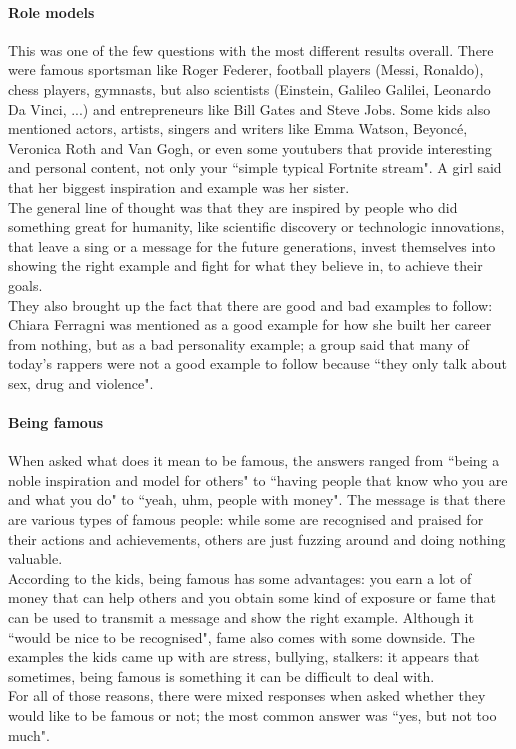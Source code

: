 \documentclass[12pt]{scrartcl}
\begin{document}
		\paragraph{Role models} This was one of the few questions with the most different results overall. There were famous sportsman like Roger Federer, football players (Messi, Ronaldo), chess players, gymnasts, but also scientists (Einstein, Galileo Galilei, Leonardo Da Vinci, ...) and entrepreneurs like Bill Gates and Steve Jobs. Some kids also mentioned actors, artists, singers and writers like Emma Watson, Beyoncé, Veronica Roth and Van Gogh, or even some youtubers that provide interesting and personal content, not only your ``simple typical Fortnite stream". A girl said that her biggest inspiration and example was her sister.\\
		The general line of thought was that they are inspired by people who did something great for humanity, like scientific discovery or technologic innovations, that leave a sing or a message for the future generations, invest themselves into showing the right example and fight for what they believe in, to achieve their goals.\\
		They also brought up the fact that there are good and bad examples to follow: Chiara Ferragni was mentioned as a good example for how she built her career from nothing, but as a bad personality example; a group said that many of today's rappers were not a good example to follow because ``they only talk about sex, drug and violence".
		
		\paragraph{Being famous} When asked what does it mean to be famous, the answers ranged from ``being a noble inspiration and model for others" to ``having people that know who you are and what you do" to ``yeah, uhm, people with money". The message is that there are various types of famous people: while some are recognised and praised for their actions and achievements, others are just fuzzing around and doing nothing valuable.\\
		According to the kids, being famous has some advantages: you earn a lot of money that can help others and you obtain some kind of exposure or fame that can be used to transmit a message and show the right example. Although it ``would be nice to be recognised", fame also comes with some downside. The examples the kids came up with are stress, bullying, stalkers: it appears that sometimes, being famous is something it can be difficult to deal with.\\
		For all of those reasons, there were mixed responses when asked whether they would like to be famous or not; the most common answer was ``yes, but not too much".
		
\end{document}
